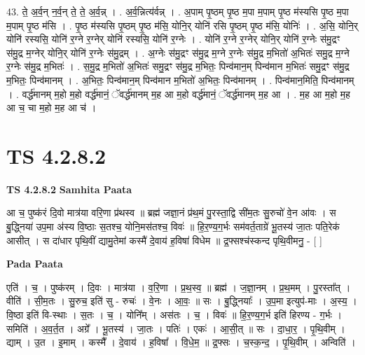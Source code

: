 \documentclass[17pt]{extarticle}
\begin{document}
43. ते॒ अ॒र्व॒न् न॒र्व॒न् ते॒ ते॒ अ॒र्व॒न्न् । . अ॒र्व॒न्नित्य॑र्वन्न् । . अ॒पाम् पृ॒ष्ठम् पृ॒ष्ठ म॒पा म॒पाम् पृ॒ष्ठ म॑स्यसि पृ॒ष्ठ म॒पा म॒पाम् पृ॒ष्ठ म॑सि । . पृ॒ष्ठ म॑स्यसि पृ॒ष्ठम् पृ॒ष्ठ म॑सि॒ योनि॒र् योनि॑ रसि पृ॒ष्ठम् पृ॒ष्ठ म॑सि॒ योनिः॑ । . अ॒सि॒ योनि॒र् योनि॑ रस्यसि॒ योनि॑ र॒ग्ने र॒ग्नेर् योनि॑ रस्यसि॒ योनि॑ र॒ग्नेः । . योनि॑ र॒ग्ने र॒ग्नेर् योनि॒र् योनि॑ र॒ग्नेः स॑मु॒द्रꣳ स॑मु॒द्र म॒ग्नेर् योनि॒र् योनि॑ र॒ग्नेः स॑मु॒द्रम् । . अ॒ग्नेः स॑मु॒द्रꣳ स॑मु॒द्र म॒ग्ने र॒ग्नेः स॑मु॒द्र म॒भितो॑ अ॒भितः॑ समु॒द्र म॒ग्ने र॒ग्नेः स॑मु॒द्र म॒भितः॑ । . स॒मु॒द्र म॒भितो॑ अ॒भितः॑ समु॒द्रꣳ स॑मु॒द्र म॒भितः॒ पिन्व॑मान॒म् पिन्व॑मान म॒भितः॑ समु॒द्रꣳ स॑मु॒द्र म॒भितः॒ पिन्व॑मानम् । . अ॒भितः॒ पिन्व॑मान॒म् पिन्व॑मान म॒भितो॑ अ॒भितः॒ पिन्व॑मानम् । . पिन्व॑मान॒मिति॒ पिन्व॑मानम् । . वर्द्ध॑मानम् म॒हो म॒हो वर्द्ध॑मानं॒ ॅवर्द्ध॑मानम् म॒ह आ म॒हो वर्द्ध॑मानं॒ ॅवर्द्ध॑मानम् म॒ह आ । . म॒ह आ म॒हो म॒ह आ च॒ चा म॒हो म॒ह आ च॑ । \newline
\pagebreak
{}

\section{ TS 4.2.8.2 }

\textbf{TS 4.2.8.2 } \newline
\textbf{Samhita Paata} \newline

आ च॒ पुष्क॑रं दि॒वो मात्र॑या वरि॒णा प्र॑थस्व ॥ ब्रह्म॑ जज्ञा॒नं प्र॑थ॒मं पु॒रस्ता॒द्वि सी॑म॒तः सु॒रुचो॑ वे॒न आ॑वः । स बु॒द्ध्निया॑ उप॒मा अ॑स्य वि॒ष्ठाः स॒तश्च॒ योनि॒मस॑तश्च॒ विवः॑ ॥ हि॒र॒ण्य॒ग॒र्भः सम॑वर्त॒ताग्रे॑ भू॒तस्य॑ जा॒तः पति॒रेक॑ आसीत् । स दा॑धार पृथि॒वीं द्यामु॒तेमां कस्मै॑ दे॒वाय॑ ह॒विषा॑ विधेम ॥ द्र॒फ्सश्च॑स्कन्द पृथि॒वीमनु॒ - [  ] \newline

\textbf{Pada Paata} \newline

एति॑ । च॒ । पुष्क॑रम् । दि॒वः । मात्र॑या । व॒रि॒णा । प्र॒थ॒स्व॒ ॥ ब्रह्म॑ । ज॒ज्ञा॒नम् । प्र॒थ॒मम् । पु॒रस्ता᳚त् । वीति॑ । सी॒म॒तः । सु॒रुच॒ इति॑ सु - रुचः॑ । वे॒नः । आ॒वः॒ ॥ सः । बु॒द्ध्नियाः᳚ । उ॒प॒मा इत्युप॑-माः । अ॒स्य॒ । वि॒ष्ठा इति॑ वि-स्थाः । स॒तः । च॒ । योनि᳚म् । अस॑तः । च॒ । विवः॑ ॥ हि॒र॒ण्य॒ग॒र्भ इति॑ हिरण्य - ग॒र्भः । समिति॑ । अ॒व॒र्त॒त । अग्रे᳚ । भू॒तस्य॑ । जा॒तः । पतिः॑ । एकः॑ । आ॒सी॒त् ॥ सः । दा॒धा॒र॒ । पृ॒थि॒वीम् । द्याम् । उ॒त । इ॒माम् । कस्मै᳚ । दे॒वाय॑ । ह॒विषा᳚ । वि॒धे॒म॒ ॥ द्र॒फ्सः । च॒स्क॒न्द॒ । पृ॒थि॒वीम् । अन्विति॑ ।  \newline
\end{document}
